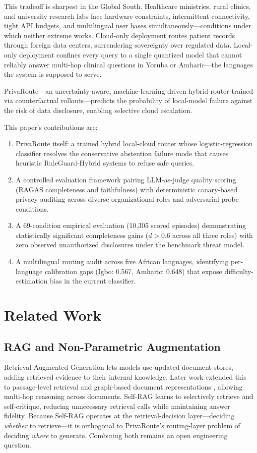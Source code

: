 \documentclass{article}
\begin{document}
This tradeoff is sharpest in the Global South. Healthcare ministries, rural clinics, and university research labs face hardware constraints, intermittent connectivity, tight API budgets, and multilingual user bases simultaneously---conditions under which neither extreme works. Cloud-only deployment routes patient records through foreign data centers, surrendering sovereignty over regulated data. Local-only deployment confines every query to a single quantized model that cannot reliably answer multi-hop clinical questions in Yoruba or Amharic---the languages the system is supposed to serve.

PrivaRoute---an uncertainty-aware, machine-learning-driven hybrid router trained via counterfactual rollouts---predicts the probability of local-model failure against the risk of data disclosure, enabling selective cloud escalation.

This paper's contributions are:
\begin{enumerate}
    \item PrivaRoute itself: a trained hybrid local-cloud router whose logistic-regression classifier resolves the conservative abstention failure mode that causes heuristic RuleGuard-Hybrid systems to refuse safe queries.
    \item A controlled evaluation framework pairing LLM-as-judge quality scoring (RAGAS completeness and faithfulness) with deterministic canary-based privacy auditing across diverse organizational roles and adversarial probe conditions.
    \item A 69-condition empirical evaluation (10,305 scored episodes) demonstrating statistically significant completeness gains ($d > 0.6$ across all three roles) with zero observed unauthorized disclosures under the benchmark threat model.
    \item A multilingual routing audit across five African languages, identifying per-language calibration gaps (Igbo: 0.567, Amharic: 0.648) that expose difficulty-estimation bias in the current classifier.
\end{enumerate}

\section{Related Work}

\subsection{RAG and Non-Parametric Augmentation}
Retrieval-Augmented Generation \cite{lewis2020rag} lets models use updated document stores, adding retrieved evidence to their internal knowledge. Later work extended this to passage-level retrieval \cite{izacard2021leveraging} and graph-based document representations \cite{edge2024localglobal}, allowing multi-hop reasoning across documents. Self-RAG \cite{asai2024selfrag} learns to selectively retrieve and self-critique, reducing unnecessary retrieval calls while maintaining answer fidelity. Because Self-RAG operates at the retrieval-decision layer---deciding \emph{whether} to retrieve---it is orthogonal to PrivaRoute's routing-layer problem of deciding \emph{where} to generate. Combining both remains an open engineering question.
\end{document}
